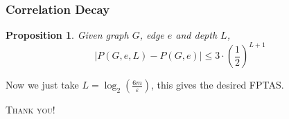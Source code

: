 \documentclass[mathserif]{beamer}
\newtheorem{proposition}[theorem]{Proposition}
\newcommand{\abs}[1]{\left\vert#1\right\vert}
\newcommand{\eps}{\varepsilon}
\begin{document}
\begin{frame}
	\frametitle{Correlation Decay}

\begin{proposition}
	Given graph $G$, edge $e$ and depth $L$,
	\[\abs{P(G,e,L) - P(G,e)} \leq 3\cdot(\frac{1}{2})^{L+1}\]
\end{proposition}
    Now we just take $L = \log_2 \left(\frac{6m}{\eps} \right)$, this gives the desired FPTAS.
\end{frame}

\begin{frame}
	\begin{center}
		\Huge \scshape Thank you!
	\end{center}
\end{frame}
\end{document}
